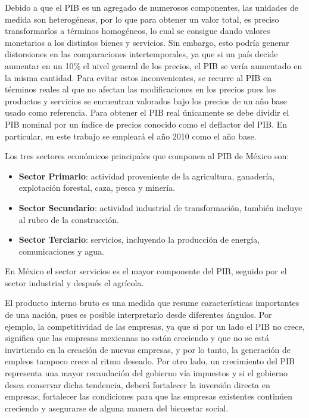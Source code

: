 Debido a que el PIB es un agregado de numerosos componentes, las unidades de medida son heterogéneas, por lo que para obtener un valor total, es preciso transformarlos a términos homogéneos, lo cual se consigue dando valores monetarios a los distintos bienes y servicios. Sin embargo, esto podría generar distorsiones en las comparaciones intertemporales, ya que si un país decide aumentar en un 10\% el nivel general de los precios, el PIB se vería aumentado en la misma cantidad. Para evitar estos inconvenientes, se recurre al PIB en términos reales al que no afectan las modificaciones en los precios pues los productos y servicios se encuentran valorados bajo los precios de un año base usado como referencia. Para obtener el PIB real únicamente se debe dividir el PIB nominal por un índice de precios conocido como el deflactor del PIB. En particular, en este trabajo se empleará el año 2010 como el año base.\bigskip

Los tres sectores económicos principales que componen al PIB de México son:

\begin{itemize}
\item \textbf{Sector Primario}: actividad proveniente de la agricultura, ganadería, explotación forestal, caza, pesca y minería.
\item \textbf{Sector Secundario}: actividad industrial de transformación, también incluye al rubro de la construcción.
\item \textbf{Sector Terciario}: servicios, incluyendo la producción de energía, comunicaciones y agua.
\end{itemize}


En México el sector servicios es el mayor componente del PIB, seguido por el sector industrial y después el agrícola.\bigskip

El producto interno bruto es una medida que resume características importantes de una nación, pues es posible interpretarlo desde diferentes ángulos. Por ejemplo, la competitividad de las empresas, ya que si por un lado el PIB no crece, significa que las empresas mexicanas no están creciendo y que no se está invirtiendo en la creación de nuevas empresas, y por lo tanto, la generación de empleos tampoco crece al ritmo deseado. Por otro lado, un crecimiento del PIB representa una mayor recaudación del gobierno vía impuestos y si el gobierno desea conservar dicha tendencia, deberá fortalecer la inversión directa en empresas, fortalecer las condiciones para que las empresas existentes continúen creciendo y asegurarse de alguna manera del bienestar social.\bigskip



